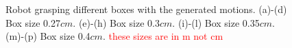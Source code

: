 \begin{figure}
  \hspace{-2.2cm}
  \begin{minipage}[c]{1\textwidth}
  \end{minipage}

  \caption{ \scriptsize{Robot grasping different boxes with the generated motions.
  (a)-(d) Box size 0.27$cm$. (e)-(h) Box size 0.3$cm$. (i)-(l) Box size 0.35$cm$. (m)-(p) Box size 0.4$cm$. \textcolor{red}{these sizes are in m not cm}}
}
    \vspace{-0.5cm}
    \label{graspdemo2}
\end{figure}

